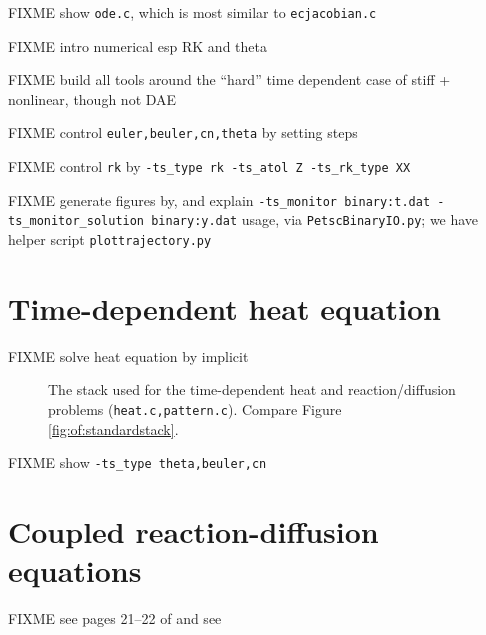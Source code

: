 FIXME show \texttt{ode.c}, which is most similar to \texttt{ecjacobian.c}

FIXME intro numerical esp RK and theta \citep{AscherPetzold1998}

FIXME build all tools around the ``hard'' time dependent case of stiff + nonlinear, though not DAE

FIXME control \texttt{euler,beuler,cn,theta} by setting steps

FIXME control \texttt{rk} by \texttt{-ts\_type rk -ts\_atol Z -ts\_rk\_type XX}

FIXME generate figures by, and explain \texttt{-ts\_monitor binary:t.dat -ts\_monitor\_solution binary:y.dat} usage, via \texttt{PetscBinaryIO.py}; we have helper script \texttt{plottrajectory.py}


\section{Time-dependent heat equation}

FIXME solve heat equation by implicit






\begin{figure}
\caption{The \PETSc stack used for the time-dependent heat and reaction/diffusion problems (\texttt{heat.c,pattern.c}).  Compare Figure \ref{fig:of:standardstack}.}
\label{fig:of:tsstack}
\end{figure}

FIXME show \texttt{-ts\_type theta,beuler,cn}


\section{Coupled reaction-diffusion equations}

FIXME see pages 21--22 of \citep{HundsdorferVerwer2003} and see \citep{Pearson1993}

